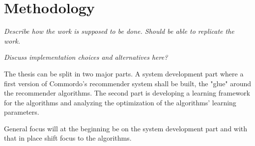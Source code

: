 \chapter{Methodology}\label{cha:method}

\textit{Describe how the work is supposed to be done. Should be able to replicate the work.}

\textit{Discuss implementation choices and alternatives here?}


The thesis can be split in two major parts. A system development part where a first version of Commordo's recommender system shall be built, the "glue" around the recommender algorithms. The second part is developing a learning framework for the algorithms and analyzing the optimization of the algorithms' learning parameters.

General focus will at the beginning be on the system development part and with that in place shift focus to the algorithms.





